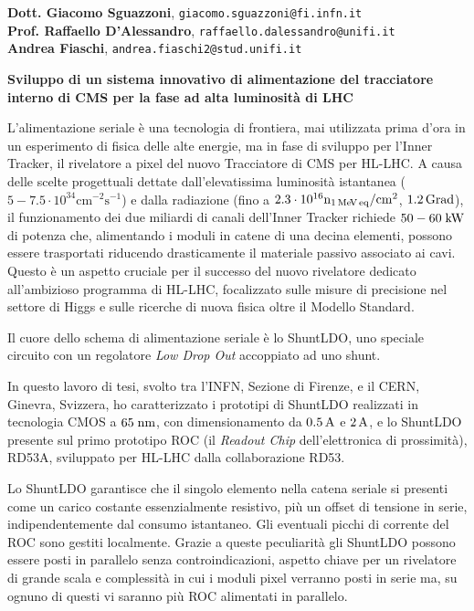 \documentclass[a4paper,12pt,italian]{article}
\begin{document}

\pagestyle{plain}
\noindent

 {\bf Dott. Giacomo Sguazzoni}, {\tt giacomo.sguazzoni@fi.infn.it}\\
 {\bf Prof. Raffaello D'Alessandro}, {\tt raffaello.dalessandro@unifi.it}\\
 {\bf Andrea Fiaschi}, {\tt andrea.fiaschi2@stud.unifi.it}

\vskip 0.5cm

\noindent \textbf{Sviluppo di un sistema innovativo di alimentazione del tracciatore interno di CMS per la fase ad alta luminosità di LHC}

\vskip 0.5cm

 L'alimentazione seriale \`e una tecnologia di frontiera, mai utilizzata prima d'ora in un esperimento di fisica delle alte energie, ma in fase di sviluppo per l'Inner Tracker, il rivelatore a pixel del nuovo Tracciatore di CMS per HL-LHC. A causa delle scelte progettuali dettate dall'elevatissima luminosit\`a istantanea ($\mathrm{5-7.5\cdot 10^{34}cm^{-2}s^{-1}}$) e dalla radiazione (fino a $\mathrm{2.3\cdot10^{16} n_{1{\rm \, Me\kern-0.125em V}\, eq}/cm^2}$, $1.2{\rm \, Grad}$), il funzionamento dei due miliardi di canali dell'Inner Tracker richiede $50-60\rm \; kW$ di potenza che, alimentando i moduli in catene di una decina elementi, possono essere trasportati riducendo drasticamente il materiale passivo associato ai cavi. Questo \`e un aspetto cruciale per il successo del nuovo rivelatore dedicato all'ambizioso programma di HL-LHC, focalizzato sulle misure di precisione nel settore di Higgs e sulle ricerche di nuova fisica oltre il Modello Standard.

Il cuore dello schema di alimentazione seriale \`e lo ShuntLDO, uno speciale circuito con un regolatore \textit{Low Drop Out} accoppiato ad uno shunt. 

In questo lavoro di tesi, svolto tra l'INFN, Sezione di Firenze, e il CERN, Ginevra, Svizzera, ho caratterizzato i prototipi di ShuntLDO realizzati in tecnologia CMOS a $65\rm \; nm$, con dimensionamento da $0.5\rm \, A$ e $2\rm \, A$, e lo ShuntLDO presente sul primo prototipo ROC (il \textit{Readout Chip} dell'elettronica di prossimit\`a), RD53A, sviluppato per HL-LHC dalla collaborazione RD53. 

Lo ShuntLDO garantisce che il singolo elemento nella catena seriale si presenti come un carico costante essenzialmente resistivo, pi\`u un offset di tensione in serie, indipendentemente dal consumo istantaneo. Gli eventuali picchi di corrente del ROC sono gestiti localmente.
Grazie a queste peculiarit\`a gli ShuntLDO possono essere posti in parallelo senza controindicazioni, aspetto chiave per un rivelatore di grande scala e complessit\`a in cui i moduli pixel verranno posti in serie ma, su ognuno di questi vi saranno più ROC alimentati in parallelo.
 
\end{document}
